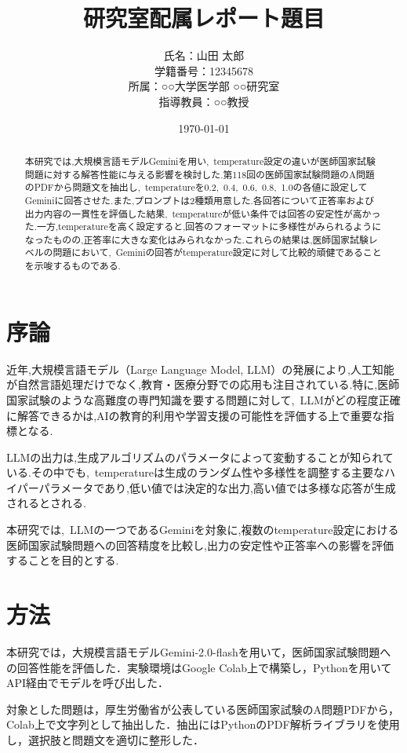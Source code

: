 \documentclass[a4paper,11pt]{jsarticle}
\title{研究室配属レポート題目}
\author{氏名：山田 太郎\\学籍番号：12345678\\所属：○○大学医学部 ○○研究室\\指導教員：○○教授}
\date{\today}
\begin{document}
\onecolumn

\newpage

\begin{abstract}
本研究では,大規模言語モデルGeminiを用い,\ temperature設定の違いが医師国家試験問題に対する解答性能に与える影響を検討した.第118回の医師国家試験問題のA問題のPDFから問題文を抽出し,\ temperatureを0.2,\ 0.4,\ 0.6,\ 0.8,\ 1.0の各値に設定してGeminiに回答させた.また,プロンプトは2種類用意した.各回答について正答率および出力内容の一貫性を評価した結果,\ temperatureが低い条件では回答の安定性が高かった.一方,temperatureを高く設定すると,回答のフォーマットに多様性がみられるようになったものの,正答率に大きな変化はみられなかった.これらの結果は,医師国家試験レベルの問題において,\ Geminiの回答がtemperature設定に対して比較的頑健であることを示唆するものである.
\end{abstract}

\section{序論}
近年,大規模言語モデル（Large Language Model, LLM）の発展により,人工知能が自然言語処理だけでなく,教育・医療分野での応用も注目されている.特に,医師国家試験のような高難度の専門知識を要する問題に対して,\ LLMがどの程度正確に解答できるかは,AIの教育的利用や学習支援の可能性を評価する上で重要な指標となる.

LLMの出力は,生成アルゴリズムのパラメータによって変動することが知られている.その中でも,\ temperatureは生成のランダム性や多様性を調整する主要なハイパーパラメータであり,低い値では決定的な出力,高い値では多様な応答が生成されるとされる.

本研究では,\ LLMの一つであるGeminiを対象に,複数のtemperature設定における医師国家試験問題への回答精度を比較し,出力の安定性や正答率への影響を評価することを目的とする.

\section{方法}
本研究では，大規模言語モデルGemini-2.0-flashを用いて，医師国家試験問題への回答性能を評価した．実験環境はGoogle Colab上で構築し，Pythonを用いてAPI経由でモデルを呼び出した．

対象とした問題は，厚生労働省が公表している医師国家試験のA問題PDFから，Colab上で文字列として抽出した．抽出にはPythonのPDF解析ライブラリを使用し，選択肢と問題文を適切に整形した．
\end{document}
